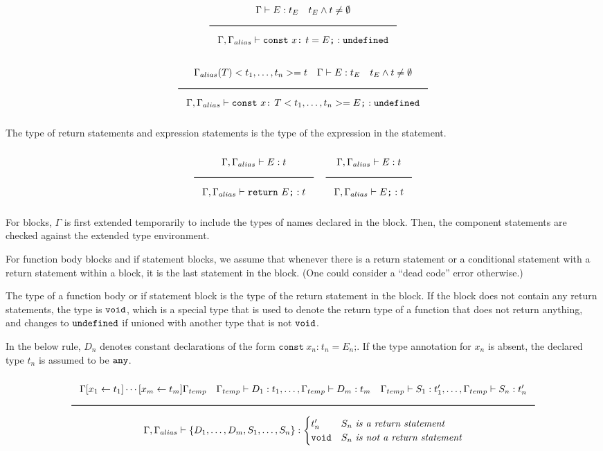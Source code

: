 \noindent
\[
  \Rule{\Gamma \vdash E : t_E \quad t_E \wedge t \neq \emptyset}{
    \Gamma, \Gamma_{alias} \vdash \texttt{const}\ x \texttt{:}\ t = E\texttt{;} : \Undefined}
\]
\noindent
\[
  \Rule{\Gamma_{alias}(T)<t_1, \ldots, t_n> = t \quad \Gamma \vdash E : t_E \quad t_E \wedge t \neq \emptyset
    }{\Gamma, \Gamma_{alias} \vdash \texttt{const}\ x \texttt{:}\ T<t_1, \ldots, t_n> = E\texttt{;} : \Undefined}
\]
\noindent

The type of return statements and expression statements is the type of the expression in the statement.

\noindent
\[
  \Rule{\Gamma, \Gamma_{alias} \vdash E : t}{\Gamma, \Gamma_{alias} \vdash \texttt{return}\ E\texttt{;} : t}
  \quad
  \Rule{\Gamma, \Gamma_{alias} \vdash E : t}{\Gamma, \Gamma_{alias} \vdash E\texttt{;} : t}
\]
\noindent

For blocks, $\Gamma$ is first extended temporarily to include the types of names declared in the block.
Then, the component statements are checked against the extended type environment.

For function body blocks and if statement blocks, we assume that whenever there is a return statement
or a conditional statement with a return statement within a block, it is the last statement in the block.
(One could consider a ``dead code'' error otherwise.)

The type of a function body or if statement block is the type of the return statement in the block.
If the block does not contain any return statements, the type is $\texttt{void}$,
which is a special type that is used to denote the return type of a function that does not return anything,
and changes to $\texttt{undefined}$ if unioned with another type that is not $\texttt{void}$.

In the below rule, $D_n$ denotes constant declarations of the form $\texttt{const}\ x_n \texttt{:}\ t_n = E_n\texttt{;}$.
If the type annotation for $x_n$ is absent, the declared type $t_n$ is assumed to be $\texttt{any}$.

\noindent
\[
  \Rule{\Gamma [x_1 \leftarrow t_1] \cdots [x_m \leftarrow t_m] \Gamma_{temp} \quad
    \Gamma_{temp} \vdash D_1 : t_1, \ldots, \Gamma_{temp} \vdash D_m : t_m \quad
    \Gamma_{temp} \vdash S_1 : t'_1, \ldots, \Gamma_{temp} \vdash S_n : t'_n
    }{\Gamma, \Gamma_{alias} \vdash \{ D_1, \ldots, D_m, S_1, \ldots, S_n\} : 
      \begin{cases}
        t'_n & S_n\ \textit{is a return statement} \\
        \Void & S_n\ \textit{is not a return statement}
      \end{cases}
    }
\]
\noindent

